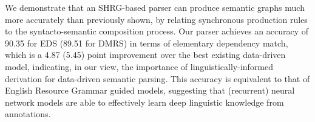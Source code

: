 We demonstrate that an SHRG-based parser can produce semantic graphs much more accurately than previously shown, by relating synchronous production rules to the syntacto-semantic composition process. Our parser achieves an accuracy of 90.35 for EDS (89.51 for DMRS) in terms of elementary dependency match, which is a 4.87 (5.45) point improvement over the best existing data-driven model, indicating, in our view, the importance of linguistically-informed derivation for data-driven semantic parsing. This accuracy is equivalent to that of English Resource Grammar guided models, suggesting that (recurrent) neural network models are able to effectively learn deep linguistic knowledge from annotations.
